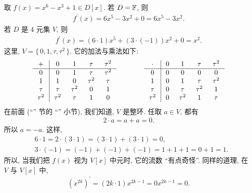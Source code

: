 \begin{example}
    取 $f(x) = x^6 - x^3 + 1 \in D[x]$. 若 $D = \mathbb{F}$, 则
    \begin{align*}
        f^{\prime}(x) = 6x^5 - 3x^2 + 0 = 6x^5 - 3x^2.
    \end{align*}
    若 $D$ 是 $4$ 元集 $V$, 则
    \begin{align*}
        f^{\prime}(x) = (6 \cdot 1)x^5 + (3 \cdot (-1)) x^2 + 0 = x^2.
    \end{align*}
    这里, $V = \{\, 0,1,\tau,\tau^2 \,\}$. 它的加法与乘法如下:
    \begin{align*}
        \arraycolsep=0.25cm
        \begin{array}{c|cccc}
            +      & 0      & 1      & \tau   & \tau^2 \\ \hline
            0      & 0      & 1      & \tau   & \tau^2 \\
            1      & 1      & 0      & \tau^2 & \tau   \\
            \tau   & \tau   & \tau^2 & 0      & 1      \\
            \tau^2 & \tau^2 & \tau   & 1      & 0      \\
        \end{array}
        \qquad \qquad
        \begin{array}{c|cccc}
            \cdot  & 0 & 1      & \tau   & \tau^2 \\ \hline
            0      & 0 & 0      & 0      & 0      \\
            1      & 0 & 1      & \tau   & \tau^2 \\
            \tau   & 0 & \tau   & \tau^2 & 1      \\
            \tau^2 & 0 & \tau^2 & 1      & \tau   \\
        \end{array}
    \end{align*}
    在前面 (``\Prerequisites'' 节的 ``\Domains'' 小节), 我们知道, $V$ 是整环. 任取 $a \in V$, 都有
    \begin{align*}
        2 \cdot a = a + a = 0.
    \end{align*}
    所以 $a = -a$. 这样,
    \begin{align*}
         & 6 \cdot 1 = 2 \cdot (3 \cdot 1) = (3 \cdot 1) + (3 \cdot 1) = 0, \\
         & 3 \cdot (-1) = (-1) + (-1) + (-1) = 1 + 1 + 1 = 0 + 1 = 1.
    \end{align*}
    所以, 当我们把 $f(x)$ 视为 $V[x]$ 中元时, 它的流数 ``有点奇怪''. 同样的道理, 在 $V$ 与 $V[x]$ 中,
    \begin{align*}
        (x^{2k})^{\prime} = (2k \cdot 1) x^{2k-1} = 0 x^{2k-1} = 0.
    \end{align*}
\end{example}

